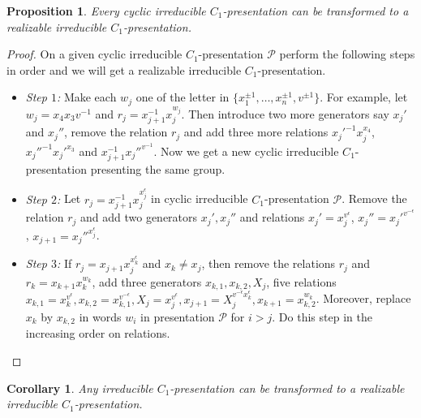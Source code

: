 \documentclass[11 pt, reqno]{amsart}
\newtheorem{corollary}[theorem]{Corollary}
\newtheorem{proposition}[theorem]{Proposition}
\theoremstyle{definition}
\numberwithin{equation}{subsection}
\begin{document}
\begin{proposition}\label{cyclic irreducible $C_1$-presentation-to-realizable-irreducible $C_1$-presentation}
Every cyclic irreducible $C_1$-presentation can be transformed to a realizable irreducible $C_1$-presentation.
\end{proposition}
\begin{proof}
On a given cyclic irreducible $C_1$-presentation $\mathcal{P}$ perform the following steps in order and we will get a realizable irreducible $C_1$-presentation.
\begin{itemize}
\item\label{Step1} \textit{Step $1$:} Make each $w_j$ one of the letter in $\{ x_1^{\pm 1}, \ldots, x_n^{\pm 1}, v^{\pm 1} \}$. For example, let $w_j= x_4 x_3 v^{-1}$ and $r_j= x_{j+1}^{-1}x_j^{w_j}$. Then introduce two more generators say $x_j'$ and $x_j''$, remove the relation $r_j$ and add three more relations $x_j'^{-1} x_j^{x_4}$, ${x_j''}^{-1} x_j'^{x_3}$ and $x_{j+1}^{-1}{x_j''}^{v^{-1}}$. Now we get a new cyclic irreducible $C_1$-presentation presenting the same group.

\vspace{.5mm}
\item \textit{Step $2$:} Let $r_j=x_{j+1}^{-1} x_j^{x_j ^{\epsilon}}$ in cyclic irreducible $C_1$-presentation $\mathcal{P}$. Remove the relation $r_j$ and add two generators $x_j',x_j''$ and relations $x_j'=x_j^{v^{\epsilon}}$,
$x_j''=x_j'^{v^{-\epsilon}}$, $x_{j+1}=x_j''^{x_j^\epsilon}$. 

\vspace{.5mm}
\item \textit{Step $3$:} If $r_j=x_{j+1}x_j^{x_k^{\epsilon}}$ and $x_k \neq x_j$, then remove the relations $r_j$ and $r_k=x_{k+1}x_k^{w_k}$, add three generators $x_{k,1}, x_{k,2}, X_j$, five relations $x_{k,1}=x_k^{v^{\epsilon}}, x_{k,2}=x_{k,1}^{v^{-\epsilon}}, X_j=x_j^{v^{\epsilon}},x_{j+1}=X_j^{v^{-\epsilon}x_k^{\epsilon}}, x_{k+1}=x_{k,2}^{w_k}$. Moreover, replace $x_k$ by $x_{k,2}$ in words $w_i$ in presentation $\mathcal{P}$ for $i > j$. Do this step in the increasing order on relations.

\end{itemize}

\end{proof}

\begin{corollary}\label{irreducible $C_1$-presentation-to-realizable-irreducible $C_1$-presentation}
Any irreducible $C_1$-presentation can be transformed to a realizable irreducible $C_1$-presentation.
\end{corollary}
\end{document}

